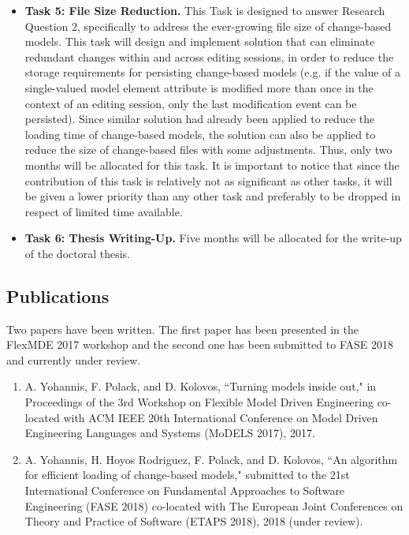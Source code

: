 \documentclass[12pt, a4paper]{report} \usepackage[titletoc]{appendix}
\begin{document}
\begin{itemize}
    \item \textbf{Task 5: File Size Reduction.} This Task is designed to answer Research Question 2, specifically to address the ever-growing file size of change-based models. This task will design and implement solution that can eliminate redundant changes within and across editing sessions, in order to reduce the storage requirements for persisting change-based models (e.g. if the value of a single-valued model element attribute is modified more than once in the context of an editing session, only the last modification event can be persisted). Since similar solution had already been applied to reduce the loading time of change-based models, the solution can also be applied to reduce the size of change-based files with some adjustments. Thus, only two months will be allocated for this task. It is important to notice that since the contribution of this task is relatively not as significant as other tasks, it will be given a lower priority than any other task and preferably to be dropped in respect of limited time available.
    \item \textbf{Task 6: Thesis Writing-Up.} Five months will be allocated for the write-up of the doctoral thesis.  
\end{itemize}




\begin{appendices}
    \chapter{Publications}
    \label{ch:publications}
    Two papers have been written. The first paper \cite{yohannis2017turning} has been presented in the FlexMDE 2017 workshop and the second one \cite{yohannis2018algorithm} has been submitted to FASE 2018 and currently under review.
    \begin{enumerate}
        \item A. Yohannis, F. Polack, and D. Kolovos, ``Turning models inside out," in Proceedings of the 3rd Workshop on Flexible Model Driven Engineering co-located with ACM IEEE 20th International Conference on Model Driven Engineering Languages and Systems (MoDELS 2017), 2017.
        \item  A. Yohannis, H. Hoyos Rodriguez, F. Polack, and D. Kolovos, ``An algorithm for efficient loading of change-based models," submitted to the 21st International Conference on Fundamental Approaches to Software Engineering (FASE 2018) co-located with The European Joint Conferences on Theory and Practice of Software (ETAPS 2018), 2018 (under review).
    \end{enumerate}
\end{appendices}

\end{document}
